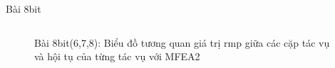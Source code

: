 \begin{frame}{Bài 8bit}
\begin{columns}
\begin{figure}[H]
            \caption{Bài 8bit(6,7,8): Biểu đồ tương quan giá trị rmp giữa các cặp tác vụ và hội tụ của từng tác vụ với MFEA2}
            \label{fig:my_label}
        \end{figure}
        \end{columns}
    \end{frame}
    
